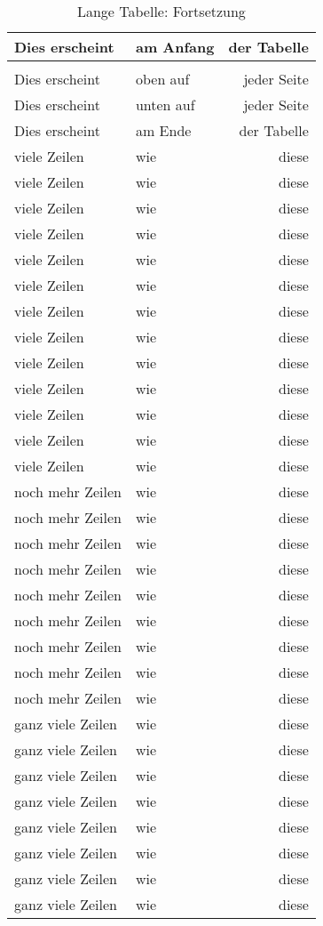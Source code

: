 \documentclass[a6paper,12pt]{scrartcl}
\begin{document}
\begin{longtable}{llr}
\caption{Lange Tabelle mit Inhalt}          \\ 
\hline
Dies erscheint    & am Anfang & der Tabelle \\ 
\hline\hline\endfirsthead
\caption{Lange Tabelle: Fortsetzung}        \\
Dies erscheint    & oben auf  & jeder Seite \\ 
\hline\endhead
\hline
Dies erscheint    & unten auf & jeder Seite \\
\hline\endfoot
\hline
Dies erscheint    & am Ende   & der Tabelle \\ 
\hline\endlastfoot
viele Zeilen      & wie       & diese       \\
viele Zeilen      & wie       & diese       \\
viele Zeilen      & wie       & diese       \\
viele Zeilen      & wie       & diese       \\
viele Zeilen      & wie       & diese       \\
viele Zeilen      & wie       & diese       \\
viele Zeilen      & wie       & diese       \\
viele Zeilen      & wie       & diese       \\
viele Zeilen      & wie       & diese       \\
viele Zeilen      & wie       & diese       \\
viele Zeilen      & wie       & diese       \\
viele Zeilen      & wie       & diese       \\
viele Zeilen      & wie       & diese       \\
noch mehr Zeilen  & wie       & diese       \\
noch mehr Zeilen  & wie       & diese       \\
noch mehr Zeilen  & wie       & diese       \\
noch mehr Zeilen  & wie       & diese       \\
noch mehr Zeilen  & wie       & diese       \\
noch mehr Zeilen  & wie       & diese       \\
noch mehr Zeilen  & wie       & diese       \\
noch mehr Zeilen  & wie       & diese       \\
noch mehr Zeilen  & wie       & diese       \\
ganz viele Zeilen & wie       & diese       \\
ganz viele Zeilen & wie       & diese       \\
ganz viele Zeilen & wie       & diese       \\
ganz viele Zeilen & wie       & diese       \\
ganz viele Zeilen & wie       & diese       \\
ganz viele Zeilen & wie       & diese       \\
ganz viele Zeilen & wie       & diese       \\
ganz viele Zeilen & wie       & diese       \\
\end{longtable}
\end{document}
